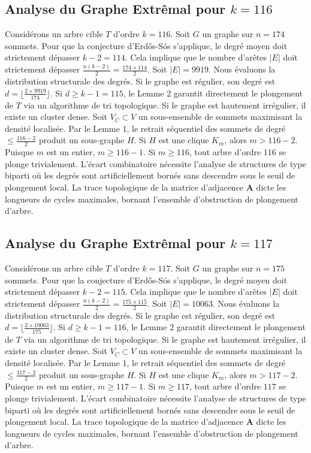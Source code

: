 \documentclass[11pt,a4paper]{article}
\begin{document}
\subsection{Analyse du Graphe Extr\^emal pour $k=116$}
Consid\'erons un arbre cible $T$ d'ordre $k=116$.
Soit $G$ un graphe sur $n=174$ sommets.
Pour que la conjecture d'Erd\H{o}s-S\'os s'applique, le degr\'e moyen doit strictement d\'epasser $k-2 = 114$.
Cela implique que le nombre d'ar\^etes $|E|$ doit strictement d\'epasser $\frac{n(k-2)}{2} = \frac{174 \times 114}{2}$.
Soit $|E| = 9919$.
Nous \'evaluons la distribution structurale des degr\'es. Si le graphe est r\'egulier, son degr\'e est $d = \lfloor \frac{2 \times 9919}{174} \rfloor$.
Si $d \geq k-1 = 115$, le Lemme 2 garantit directement le plongement de $T$ via un algorithme de tri topologique.
Si le graphe est hautement irr\'egulier, il existe un cluster dense. Soit $V_C \subset V$ un sous-ensemble de sommets maximisant la densit\'e localis\'ee.
Par le Lemme 1, le retrait s\'equentiel des sommets de degr\'e $\leq \frac{116-2}{2}$ produit un sous-graphe $H$.
Si $H$ est une clique $K_{m}$, alors $m > 116-2$. Puisque $m$ est un entier, $m \geq 116-1$. Si $m \geq 116$, tout arbre d'ordre $116$ se plonge trivialement.
L'\'ecart combinatoire n\'ecessite l'analyse de structures de type biparti o\`u les degr\'es sont artificiellement born\'es sans descendre sous le seuil de plongement local. La trace topologique de la matrice d'adjacence $\mathbf{A}$ dicte les longueurs de cycles maximales, bornant l'ensemble d'obstruction de plongement d'arbre.


\subsection{Analyse du Graphe Extr\^emal pour $k=117$}
Consid\'erons un arbre cible $T$ d'ordre $k=117$.
Soit $G$ un graphe sur $n=175$ sommets.
Pour que la conjecture d'Erd\H{o}s-S\'os s'applique, le degr\'e moyen doit strictement d\'epasser $k-2 = 115$.
Cela implique que le nombre d'ar\^etes $|E|$ doit strictement d\'epasser $\frac{n(k-2)}{2} = \frac{175 \times 115}{2}$.
Soit $|E| = 10063$.
Nous \'evaluons la distribution structurale des degr\'es. Si le graphe est r\'egulier, son degr\'e est $d = \lfloor \frac{2 \times 10063}{175} \rfloor$.
Si $d \geq k-1 = 116$, le Lemme 2 garantit directement le plongement de $T$ via un algorithme de tri topologique.
Si le graphe est hautement irr\'egulier, il existe un cluster dense. Soit $V_C \subset V$ un sous-ensemble de sommets maximisant la densit\'e localis\'ee.
Par le Lemme 1, le retrait s\'equentiel des sommets de degr\'e $\leq \frac{117-2}{2}$ produit un sous-graphe $H$.
Si $H$ est une clique $K_{m}$, alors $m > 117-2$. Puisque $m$ est un entier, $m \geq 117-1$. Si $m \geq 117$, tout arbre d'ordre $117$ se plonge trivialement.
L'\'ecart combinatoire n\'ecessite l'analyse de structures de type biparti o\`u les degr\'es sont artificiellement born\'es sans descendre sous le seuil de plongement local. La trace topologique de la matrice d'adjacence $\mathbf{A}$ dicte les longueurs de cycles maximales, bornant l'ensemble d'obstruction de plongement d'arbre.
\end{document}
